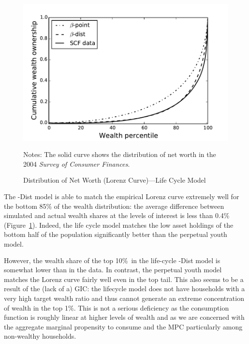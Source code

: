 \documentclass[12pt,titlepage]{econtex}
\begin{document}
\begin{figure}
  \caption{Distribution of Net Worth (Lorenz Curve)---Life Cycle Model}
  \label{LorenzLifecycle}
  \begin{center}
    \includegraphics[scale=1.25]{./Figures/LorenzLifecycle}
  \end{center}
   \footnotesize Notes: The solid curve shows the distribution of net worth in the 2004 \emph{Survey of Consumer Finances}.
\end{figure}

The \Discount-Dist model is able to match the empirical Lorenz curve extremely well for the bottom 85\% of the wealth distribution: the average difference between simulated and actual wealth shares at the levels of interest is less than 0.4\% (Figure~\ref{LorenzLifecycle}).  Indeed, the life cycle model matches the low asset holdings of the bottom half of the population significantly better than the perpetual youth model.

However, the wealth share of the top 10\%\ in the life-cycle \Discount-Dist model is somewhat lower than in the data. In contrast, the perpetual youth model matches the Lorenz curve fairly well even in the top tail.  This also seems to be a result of the (lack of a) GIC: the lifecycle model does not have households with a very high target wealth ratio and thus cannot generate an extreme concentration of wealth in the top 1\%.  This is not a serious deficiency as the consumption function is roughly linear at higher levels of wealth and as we are concerned with the aggregate marginal propensity to consume and the MPC particularly among non-wealthy households.
\end{document}
